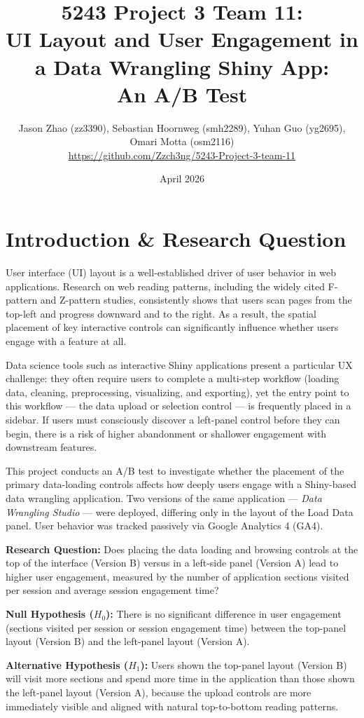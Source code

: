\documentclass{article}
\title{5243 Project 3 Team 11:\\
\large UI Layout and User Engagement in a Data Wrangling Shiny App:\\An A/B Test}
\author{Jason Zhao (zz3390), Sebastian Hoornweg (smh2289), Yuhan Guo (yg2695), Omari Motta (osm2116)\\[0.5em]
\small \url{https://github.com/Zzch3ng/5243-Project-3-team-11}}
\date{April 2026}
\begin{document}
\maketitle

\section{Introduction \& Research Question}

User interface (UI) layout is a well-established driver of user behavior in web applications. Research on web reading patterns, including the widely cited F-pattern and Z-pattern studies, consistently shows that users scan pages from the top-left and progress downward and to the right. As a result, the spatial placement of key interactive controls can significantly influence whether users engage with a feature at all.

Data science tools such as interactive Shiny applications present a particular UX challenge: they often require users to complete a multi-step workflow (loading data, cleaning, preprocessing, visualizing, and exporting), yet the entry point to this workflow --- the data upload or selection control --- is frequently placed in a sidebar. If users must consciously discover a left-panel control before they can begin, there is a risk of higher abandonment or shallower engagement with downstream features.

This project conducts an A/B test to investigate whether the placement of the primary data-loading controls affects how deeply users engage with a Shiny-based data wrangling application. Two versions of the same application --- \emph{Data Wrangling Studio} --- were deployed, differing only in the layout of the Load Data panel. User behavior was tracked passively via Google Analytics 4 (GA4).

\textbf{Research Question:} Does placing the data loading and browsing controls at the top of the interface (Version B) versus in a left-side panel (Version A) lead to higher user engagement, measured by the number of application sections visited per session and average session engagement time?

\textbf{Null Hypothesis ($H_0$):} There is no significant difference in user engagement (sections visited per session or session engagement time) between the top-panel layout (Version B) and the left-panel layout (Version A).

\textbf{Alternative Hypothesis ($H_1$):} Users shown the top-panel layout (Version B) will visit more sections and spend more time in the application than those shown the left-panel layout (Version A), because the upload controls are more immediately visible and aligned with natural top-to-bottom reading patterns.
\end{document}
